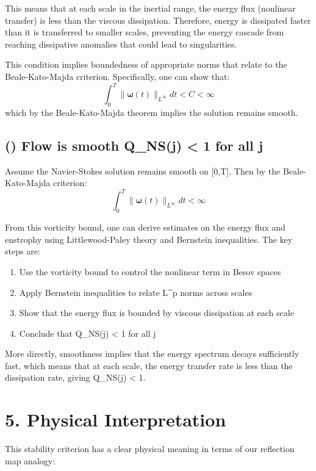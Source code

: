 \documentclass[11pt]{article}
\begin{document}
This means that at each scale in the inertial range, the energy flux (nonlinear transfer) is less than the viscous dissipation. Therefore, energy is dissipated faster than it is transferred to smaller scales, preventing the energy cascade from reaching dissipative anomalies that could lead to singularities.

This condition implies boundedness of appropriate norms that relate to the Beale-Kato-Majda criterion. Specifically, one can show that:
\[
\int_0^T \|\boldsymbol{\omega}(t)\|_{L^\infty} dt < C < \infty
\]
which by the Beale-Kato-Majda theorem implies the solution remains smooth.

\subsection{(\Leftarrow) Flow is smooth \Rightarrow Q_{NS}(j) < 1 for all j}

Assume the Navier-Stokes solution remains smooth on [0,T]. Then by the Beale-Kato-Majda criterion:
\[
\int_0^T \|\boldsymbol{\omega}(t)\|_{L^\infty} dt < \infty
\]

From this vorticity bound, one can derive estimates on the energy flux and enstrophy using Littlewood-Paley theory and Bernstein inequalities. The key steps are:

\begin{enumerate}
\item Use the vorticity bound to control the nonlinear term in Besov spaces
\item Apply Bernstein inequalities to relate L^p norms across scales
\item Show that the energy flux is bounded by viscous dissipation at each scale
\item Conclude that Q_{NS}(j) < 1 for all j
\end{enumerate}

More directly, smoothness implies that the energy spectrum decays sufficiently fast, which means that at each scale, the energy transfer rate is less than the dissipation rate, giving Q_{NS}(j) < 1.

\section{5. Physical Interpretation}

This stability criterion has a clear physical meaning in terms of our reflection map analogy:
\end{document}
